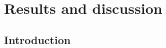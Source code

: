 \documentclass[11pt,bibliography=totoc,index=totoc]{scrbook}   %
\begin{document}





%
\chapter{Results and discussion}\label{cha:results} %
%

%
\section{Introduction}\label{sec:resultsIntro}
%
\end{document}
